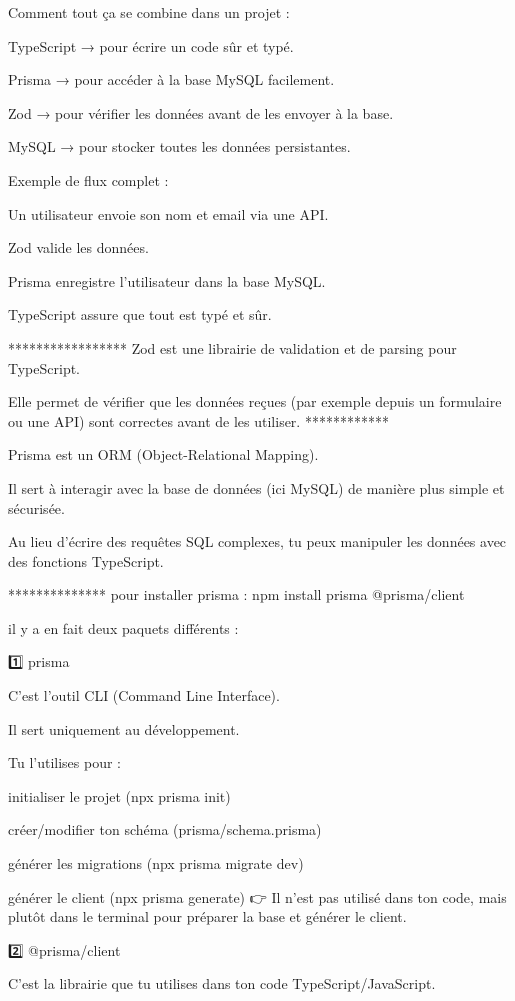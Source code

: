 Comment tout ça se combine dans un projet :

TypeScript → pour écrire un code sûr et typé.

Prisma → pour accéder à la base MySQL facilement.

Zod → pour vérifier les données avant de les envoyer à la base.

MySQL → pour stocker toutes les données persistantes.

Exemple de flux complet :

Un utilisateur envoie son nom et email via une API.

Zod valide les données.

Prisma enregistre l’utilisateur dans la base MySQL.

TypeScript assure que tout est typé et sûr.

*****************
Zod est une librairie de validation et de parsing pour TypeScript.

Elle permet de vérifier que les données reçues (par exemple depuis un formulaire ou une API) sont correctes avant de les utiliser.
************

Prisma est un ORM (Object-Relational Mapping).

Il sert à interagir avec la base de données (ici MySQL) de manière plus simple et sécurisée.

Au lieu d’écrire des requêtes SQL complexes, tu peux manipuler les données avec des fonctions TypeScript.

**************
pour installer prisma :
npm install prisma @prisma/client

il y a en fait deux paquets différents :

1️⃣ prisma

C’est l’outil CLI (Command Line Interface).

Il sert uniquement au développement.

Tu l’utilises pour :

initialiser le projet (npx prisma init)

créer/modifier ton schéma (prisma/schema.prisma)

générer les migrations (npx prisma migrate dev)

générer le client (npx prisma generate)
👉 Il n’est pas utilisé dans ton code, mais plutôt dans le terminal pour préparer la base et générer le client.

2️⃣ @prisma/client

C’est la librairie que tu utilises dans ton code TypeScript/JavaScript.

